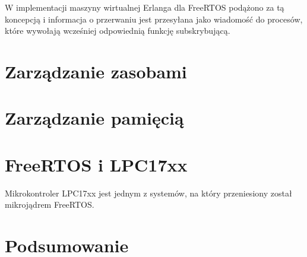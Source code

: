 W implementacji maszyny wirtualnej Erlanga dla FreeRTOS podążono za tą koncepcją i informacja o przerwaniu jest przesyłana jako wiadomość do procesów, które wywołają wcześniej odpowiednią funkcję subskrybującą.

\section{Zarządzanie zasobami}
\label{sec:rtosZasoby}

\section{Zarządzanie pamięcią}
\label{sec:rtosPamiec}

\section{FreeRTOS i LPC17xx}
\label{sec:rtosLPC}

Mikrokontroler LPC17xx jest jednym z systemów, na który przeniesiony został mikrojądrem FreeRTOS.

\section{Podsumowanie}
\label{sec:rtosPodsumowanie}